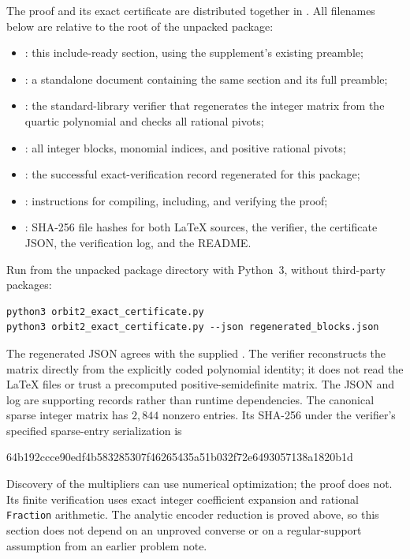 \documentclass[11pt]{article}
\theoremstyle{definition}
\begin{document}
The proof and its exact certificate are distributed together in
. All filenames below are relative
to the root of the unpacked package:
\begin{itemize}
\item {}:
this include-ready section, using the supplement's existing preamble;
\item {}:
a standalone document containing the same section and its full preamble;
\item {}:
the standard-library verifier that regenerates the integer matrix
from the quartic polynomial and checks all rational pivots;
\item {}:
all integer blocks, monomial indices, and positive rational pivots;
\item {}:
the successful exact-verification record regenerated for this package;
\item {}:
instructions for compiling, including, and verifying the proof;
\item {}:
SHA-256 file hashes for both LaTeX sources, the verifier, the certificate
JSON, the verification log, and the README.
\end{itemize}
Run from the unpacked package directory with Python~3, without
third-party packages:
\begin{verbatim}
python3 orbit2_exact_certificate.py
python3 orbit2_exact_certificate.py --json regenerated_blocks.json
\end{verbatim}
The regenerated JSON agrees with the supplied
. The verifier reconstructs the
matrix directly from the explicitly coded polynomial identity; it does
not read the LaTeX files or trust a precomputed positive-semidefinite
matrix. The JSON and log are supporting records rather than runtime
dependencies.
The canonical sparse integer matrix has \(2{,}844\) nonzero entries.
Its SHA-256 under the verifier's specified sparse-entry serialization is
\begin{center}
\small\ttfamily
64b192ccce90edf4b583285307f46265435a51b032f72e6493057138a1820b1d
\end{center}
Discovery of the multipliers can use numerical optimization; the proof
does not. Its finite verification uses exact integer coefficient
expansion and rational \texttt{Fraction} arithmetic. The analytic
encoder reduction is proved above, so this section does not depend
on an unproved converse or on a regular-support assumption from an
earlier problem note.
\end{document}
